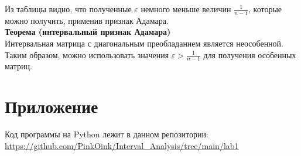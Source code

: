 Из таблицы видно, что полученные $\varepsilon$ немного меньше величин $\frac{1}{n - 1}$, которые можно получить, применив признак Адамара. \\

\textbf{Теорема (интервальный признак Адамара)} \\
Интервальная матрица с диагональным преобладанием является неособенной. \\

Таким образом, можно использовать значения $\varepsilon > \frac{1}{n - 1}$ для получения особенных матриц.


\section{Приложение}
Код программы на Python лежит в данном репозитории: \\
\url{https://github.com/PinkOink/Interval_Analysis/tree/main/lab1}{}


